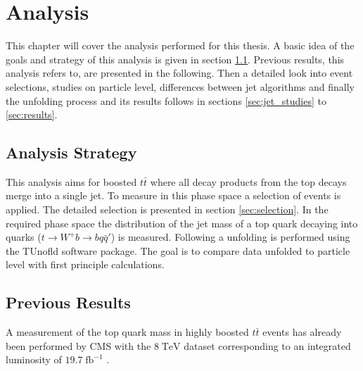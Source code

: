 \chapter{Analysis}
\label{ch:Ana}
	This chapter will cover the analysis performed for this thesis. A basic idea of the goals and strategy of this analysis is given in section \ref{sec:strategy}. Previous results, this analysis refers to, are presented in the following. Then a detailed look into event selections, studies on particle level, differences between jet algorithms and finally the unfolding process and its results follows in sections \ref{sec:jet_studies} to \ref{sec:results}.
\section{Analysis Strategy}
\label{sec:strategy}
	This analysis aims for boosted $t\bar{t}$ where all decay products from the top decays merge into a single jet. To measure in this phase space a selection of events is applied. The detailed selection is presented in section \ref{sec:selection}. In the required phase space the distribution of the jet mass of a top quark decaying into quarks ($t\rightarrow W^{+} b \rightarrow b q \bar{q}'$) is measured. Following a unfolding is performed using the TUnofld \cite{tunfold} software package. The goal is to compare data unfolded to particle level with first principle calculations.
\section{Previous Results}
	A measurement of the top quark mass in highly boosted $t\bar{t}$ events has already been performed by CMS with the $8\;\text{TeV}$ dataset corresponding to an integrated luminosity of $19.7\;\text{fb}^{-1}$ \cite{torben_paper}.
